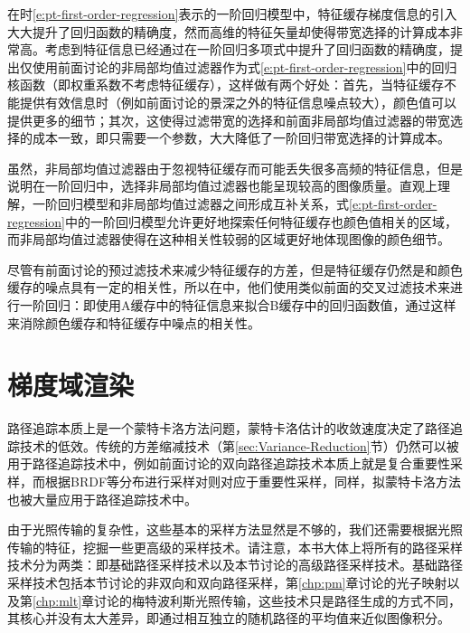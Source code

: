 在时\ref{e:pt-first-order-regression}表示的一阶回归模型中，特征缓存梯度信息的引入大大提升了回归函数的精确度，然而高维的特征矢量却使得带宽选择的计算成本非常高。考虑到特征信息已经通过在一阶回归多项式中提升了回归函数的精确度，\cite{a:NonlinearlyWeightedFirstorderRegressionforDenoisingMonteCarloRenderings}提出仅使用前面讨论的非局部均值过滤器作为式\ref{e:pt-first-order-regression}中的回归核函数（即权重系数不考虑特征缓存），这样做有两个好处：首先，当特征缓存不能提供有效信息时（例如前面讨论的景深之外的特征信息噪点较大），颜色值可以提供更多的细节；其次，这使得过滤带宽的选择和前面非局部均值过滤器的带宽选择的成本一致，即只需要一个参数，大大降低了一阶回归带宽选择的计算成本。

虽然，非局部均值过滤器由于忽视特征缓存而可能丢失很多高频的特征信息，但是\cite{a:NonlinearlyWeightedFirstorderRegressionforDenoisingMonteCarloRenderings}说明在一阶回归中，选择非局部均值过滤器也能呈现较高的图像质量。直观上理解，一阶回归模型和非局部均值过滤器之间形成互补关系，式\ref{e:pt-first-order-regression}中的一阶回归模型允许更好地探索任何特征缓存也颜色值相关的区域，而非局部均值过滤器使得在这种相关性较弱的区域更好地体现图像的颜色细节。

尽管有前面讨论的预过滤技术来减少特征缓存的方差，但是特征缓存仍然是和颜色缓存的噪点具有一定的相关性，所以在\cite{a:NonlinearlyWeightedFirstorderRegressionforDenoisingMonteCarloRenderings}中，他们使用类似前面的交叉过滤技术来进行一阶回归：即使用A缓存中的特征信息来拟合B缓存中的回归函数值，通过这样来消除颜色缓存和特征缓存中噪点的相关性。










\section{梯度域渲染}\label{sec:pt-gradient-domian-path-tracing}
路径追踪本质上是一个蒙特卡洛方法问题，蒙特卡洛估计的收敛速度决定了路径追踪技术的低效。传统的方差缩减技术（第\ref{sec:Variance-Reduction}节）仍然可以被用于路径追踪技术中，例如前面讨论的双向路径追踪技术本质上就是复合重要性采样，而根据BRDF等分布进行采样对则对应于重要性采样，同样，拟蒙特卡洛方法也被大量应用于路径追踪技术中。

由于光照传输的复杂性，这些基本的采样方法显然是不够的，我们还需要根据光照传输的特征，挖掘一些更高级的采样技术。请注意，本书大体上将所有的路径采样技术分为两类：即基础路径采样技术以及本节讨论的高级路径采样技术。基础路径采样技术包括本节讨论的非双向和双向路径采样，第\ref{chp:pm}章讨论的光子映射以及第\ref{chp:mlt}章讨论的梅特波利斯光照传输，这些技术只是路径生成的方式不同，其核心并没有太大差异，即通过相互独立的随机路径的平均值来近似图像积分。

